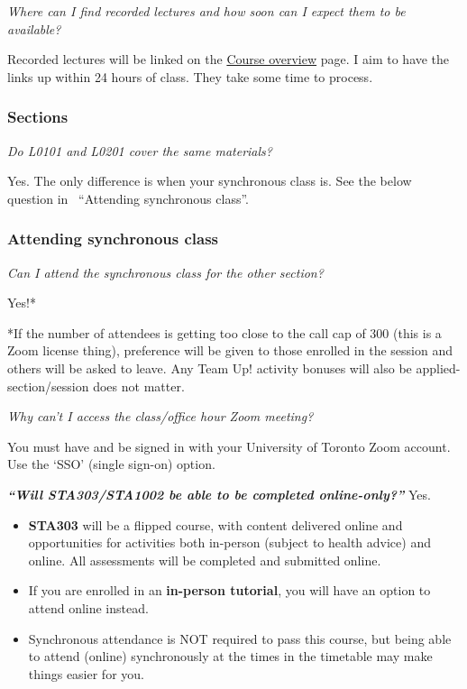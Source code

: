 \documentclass[
]{book}
\begin{document}
\emph{Where can I find recorded lectures and how soon can I expect them to be available?}

Recorded lectures will be linked on the \href{https://q.utoronto.ca/courses/204826/pages/course-overview}{Course overview} page. I aim to have the links up within 24 hours of class. They take some time to process.

\hypertarget{sections}{%
\subsubsection{Sections}\label{sections}}

\emph{Do L0101 and L0201 cover the same materials?}

Yes. The only difference is when your synchronous class is. See the below question in~ ``Attending synchronous class''.

\hypertarget{attending-synchronous-class}{%
\subsubsection{Attending synchronous class}\label{attending-synchronous-class}}

\emph{Can I attend the synchronous class for the other section?}

Yes!*

*If the number of attendees is getting too close to the call cap of 300 (this is a Zoom license thing), preference will be given to those enrolled in the session and others will be asked to leave. Any Team Up! activity bonuses will also be applied-section/session does not matter.

\emph{Why can't I access the class/office hour Zoom meeting?}

You must have and be signed in with your University of Toronto Zoom account. Use the `SSO' (single sign-on) option.

\textbf{\emph{``\textbf{Will STA303/STA1002 be able to be }completed online-only?''}} Yes.

\begin{itemize}
\item
  \textbf{STA303} will be a flipped course, with content delivered online and opportunities for activities both in-person (subject to health advice) and online. All assessments will be completed and submitted online.
\item
  If you are enrolled in an \textbf{in-person tutorial}, you will have an option to attend online instead.
\item
  Synchronous attendance is NOT required to pass this course, but being able to attend (online) synchronously at the times in the timetable may make things easier for you.
\end{itemize}
\end{document}
